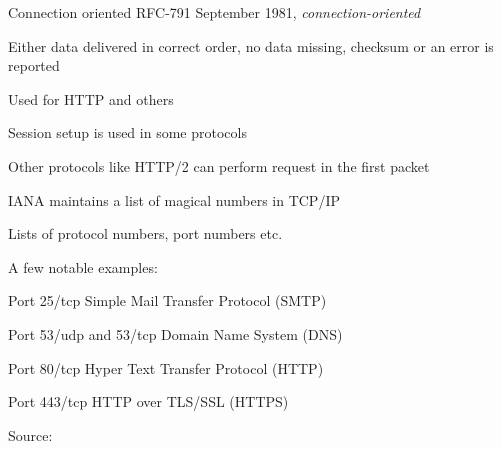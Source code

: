 \documentclass[Screen16to9,17pt]{foils}
\begin{document}
\begin{list1}
\item Connection oriented RFC-791 September 1981, \emph{connection-oriented}
\item Either data delivered in correct order, no data missing, checksum or an error is reported
\item Used for HTTP and others
\end{list1}



\begin{list2}
\item Session setup is used in some protocols
\item Other protocols like HTTP/2 can perform request in the first packet
\end{list2}



\begin{list1}
\item IANA maintains a list of magical numbers in TCP/IP
\item Lists of protocol numbers, port numbers etc.
\item A few notable examples:
\begin{list2}
\item Port 25/tcp Simple Mail Transfer Protocol (SMTP)
\item Port 53/udp and 53/tcp Domain Name System (DNS)
\item Port 80/tcp Hyper Text Transfer Protocol (HTTP)
\item Port 443/tcp HTTP over TLS/SSL (HTTPS)
\end{list2}
\item Source: 
\end{list1}




\end{document}
